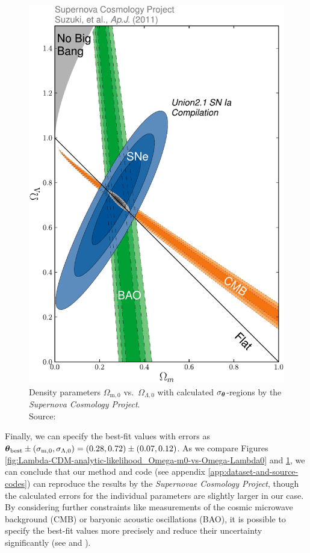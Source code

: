 \begin{figure}[H]
\begin{minipage}{8cm}
       \includegraphics[scale=0.53]{figures/plots/PDF/Union2.1_Om-Ol_slide.pdf}
       \caption{Density parameters $\Omega_{\text{m},0}$ vs.\ $\Omega_{\Lambda,0}$ with calculated $\sigma_{\vb*{\theta}}$-regions by the \textit{Supernova Cosmology Project}. \\
       Source: \cite[Figure 5]{Suzuki2012}}
       \label{fig:Union2.1_Om-Ol_slide}
    \end{minipage}
\end{figure}

\noindent Finally, we can specify the best-fit values with errors as
$\vb*{\theta}_{\text{best}} \pm (\sigma_{\text{m},0}, \sigma_{\Lambda,0}) = (0.28, 0.72) \pm (0.07, 0.12)$. As we compare Figures \ref{fig:Lambda-CDM-analytic-likelihood_Omega-m0-vs-Omega-Lambda0} and \ref{fig:Union2.1_Om-Ol_slide}, we can conclude that our method and code (see appendix \ref{app:dataset-and-source-codes}) can reproduce the results by the \textit{Supernovae Cosmology Project}, though the calculated errors for the individual parameters are slightly larger in our case. \\ 
By considering further constraints like measurements of the cosmic microwave background (CMB) or baryonic acoustic oscillations (BAO), it is possible to specify the best-fit values more precisely and reduce their uncertainty significantly (see \cite[Table 7]{Suzuki2012} and \cite[Table 6 and 7]{Planck2020}).


